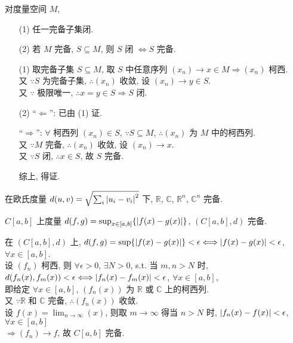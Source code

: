 \documentclass{note}
\begin{document}
\begin{thm}[(课本定理 12.6)]\label{thm-12.6}
    对度量空间 $M$,
    \begin{itemize}
        \item[(1)] 任一完备子集闭.
        \item[(2)] 若 $M$ 完备, $S\subseteq M$, 则 $S$ 闭 $\Longleftrightarrow S$ 完备.
    \end{itemize}
\end{thm}
\begin{pf}
    \begin{itemize}
        \item[(1)] 取完备子集 $S\subseteq M$, 取 $S$ 中任意序列 $(x_n)\rightarrow x\in M\Longrightarrow(x_n)$ 柯西.\\
        又 $\because S$ 为完备子集, $\therefore(x_n)$ 收敛, 设 $(x_n)\rightarrow y\in S$.\\
        又 $\because$ 极限唯一, $\therefore x=y\in S\Longrightarrow S$ 闭.
        \item[(2)] ``$\Longleftarrow$'': 已由 (1) 证.

        ``$\Longrightarrow$'': $\forall$ 柯西列 $(x_n)\in S$, $\because S\subseteq M$, $\therefore(x_n)$ 为 $M$ 中的柯西列.\\
        又 $\because M$ 完备, $\therefore(x_n)$ 收敛, 设 $(x_n)\rightarrow x$.\\
        又 $\because S$ 闭, $\therefore x\in S$, 故 $S$ 完备.

        综上, 得证.
    \end{itemize}
\end{pf}

\begin{eg}
    在欧氏度量 $d(u,v)=\sqrt{\sum_i\left\lvert u_i-v_i\right\rvert^2}$ 下, $\mathbb{R}$, $\mathbb{C}$, $\mathbb{R}^n$, $\mathbb{C}^n$ 完备.
\end{eg}

\begin{eg}[(课本例 12.11)]
    $C[a,b]$ 上度量 $d(f,g)=\sup_{x\in[a,b]}\{\left\lvert f(x)-g(x)\right\rvert\}$, $(C[a,b],d)$ 完备.
    \begin{pf}
        在 $(C[a,b],d)$ 上, $d(f,g)=\sup\{\left\lvert f(x)-g(x)\right\rvert\}<\epsilon\Longleftrightarrow\left\lvert f(x)-g(x)\right\rvert<\epsilon$, $\forall x\in[a,b]$.\\
        设 $(f_n)$ 柯西, 则 $\forall\epsilon>0$, $\exists N>0$, s.t. 当 $m,n>N$ 时, $d(f_n(x),f_m(x))<\epsilon\Longleftrightarrow\left\lvert f_n(x)-f_m(x)\right\rvert<\epsilon$, $\forall x\in[a,b]$,\\
        即给定 $\forall x\in[a,b]$, $(f_n(x))$ 为 $\mathbb{R}$ 或 $\mathbb{C}$ 上的柯西列.\\
        又 $\because\mathbb{R}$ 和 $\mathbb{C}$ 完备, $\therefore(f_n(x))$ 收敛.\\
        设 $f(x)=\lim_{n\rightarrow\infty}(x)$, 则取 $m\rightarrow\infty$ 得当 $n>N$ 时, $\left\lvert f_n(x)-f(x)\right\rvert<\epsilon$, $\forall x\in[a,b]$\\
        $\Longrightarrow(f_n)\rightarrow f$, 故 $C[a,b]$ 完备.
    \end{pf}
\end{eg}
\end{document}
